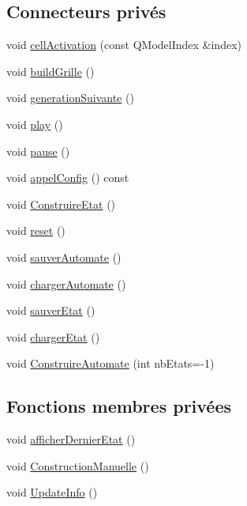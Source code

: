 \subsection*{Connecteurs privés}
\begin{DoxyCompactItemize}
\item 
void \mbox{\hyperlink{classfenetre2_d_abb32f8f446b8e4fd1b0d0dc35cf9286e}{cell\+Activation}} (const Q\+Model\+Index \&index)
\item 
void \mbox{\hyperlink{classfenetre2_d_a63ca9b8bcfad281fc0180d93f5ca0f18}{build\+Grille}} ()
\item 
void \mbox{\hyperlink{classfenetre2_d_a643866b152510c7a80412a084248eb7d}{generation\+Suivante}} ()
\item 
void \mbox{\hyperlink{classfenetre2_d_a8cba1977fee440949f2711bbc15f7f63}{play}} ()
\item 
void \mbox{\hyperlink{classfenetre2_d_adbc8e3e644842494a6512373e0b82a98}{pause}} ()
\item 
void \mbox{\hyperlink{classfenetre2_d_aa624848d78b19079259e7c9f5c90842f}{appel\+Config}} () const
\item 
void \mbox{\hyperlink{classfenetre2_d_a3824878eb7b51b5137d16c969e380861}{Construire\+Etat}} ()
\item 
void \mbox{\hyperlink{classfenetre2_d_a5f143e0cff9013924179309bb25a0e35}{reset}} ()
\item 
void \mbox{\hyperlink{classfenetre2_d_ae0d67a7737c6202402e4c8079b6b71ce}{sauver\+Automate}} ()
\item 
void \mbox{\hyperlink{classfenetre2_d_a01cea5868b15fc22c037902189f909c2}{charger\+Automate}} ()
\item 
void \mbox{\hyperlink{classfenetre2_d_a286d9d1a68ca68cd32d79e4763b7fce4}{sauver\+Etat}} ()
\item 
void \mbox{\hyperlink{classfenetre2_d_ac300cc61b3bcec7a09e254c7aba0600e}{charger\+Etat}} ()
\item 
void \mbox{\hyperlink{classfenetre2_d_a87860de97440c7a1c2ce433c7df06fab}{Construire\+Automate}} (int nb\+Etats=-\/1)
\end{DoxyCompactItemize}
\subsection*{Fonctions membres privées}
\begin{DoxyCompactItemize}
\item 
void \mbox{\hyperlink{classfenetre2_d_aba29ccc1d2c09705dc738d2bb55a3491}{afficher\+Dernier\+Etat}} ()
\item 
void \mbox{\hyperlink{classfenetre2_d_ab5b52fa2a6d5bb3bea2b52befadd372d}{Construction\+Manuelle}} ()
\item 
void \mbox{\hyperlink{classfenetre2_d_af2fdfcf03b855f1ff21a02fa80ef9307}{Update\+Info}} ()
\end{DoxyCompactItemize}
